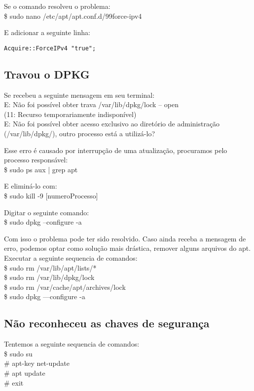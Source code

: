 Se o comando resolveu o problema: \\
{\ttfamily\$ sudo nano /etc/apt/apt.conf.d/99force-ipv4}

E adicionar a seguinte linha:
\begin{lstlisting}
Acquire::ForceIPv4 "true";
\end{lstlisting}

\subsection{Travou o DPKG}
Se recebeu a seguinte mensagem em seu terminal: \\
{\ttfamily E: Não foi possível obter trava /var/lib/dpkg/lock – open \\ 
(11: Recurso temporariamente indisponível) \\
E: Não foi possível obter acesso exclusivo ao diretório de administração \\ 
(/var/lib/dpkg/), outro processo está a utilizá-lo?}

Esse erro é causado por interrupção de uma atualização, procuramos pelo processo responsável: \\
{\ttfamily\$ sudo ps aux | grep apt}

E eliminá-lo com:\\
{\ttfamily\$ sudo kill -9 [numeroProcesso]}

Digitar o seguinte comando: \\
{\ttfamily\$ sudo dpkg --configure -a}

Com isso o problema pode ter sido resolvido. Caso ainda receba a mensagem de erro, podemos optar como solução mais drástica, remover alguns arquivos do apt. Executar a seguinte sequencia de comandos: \\
{\ttfamily\$ sudo rm /var/lib/apt/lists/* \\
\$ sudo rm /var/lib/dpkg/lock \\
\$ sudo rm /var/cache/apt/archives/lock \\
\$ sudo dpkg ---configure -a}

\subsection{Não reconheceu as chaves de segurança}
Tentemos a seguinte sequencia de comandos: \\
{\ttfamily\$ sudo su \\
\# apt-key net-update \\
\# apt update \\
\# exit}

